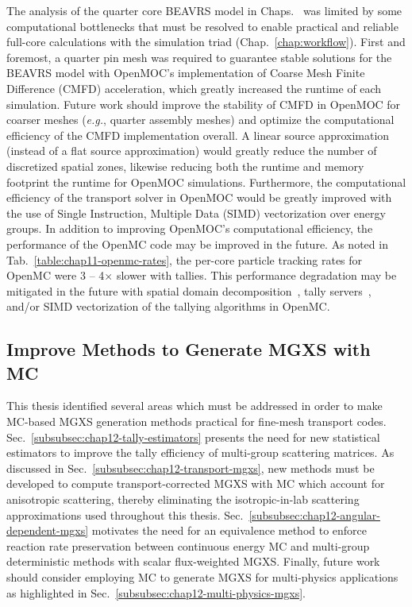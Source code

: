 The analysis of the quarter core \ac{BEAVRS} model in Chaps.~ was limited by some computational bottlenecks that must be resolved to enable practical and reliable full-core calculations with the simulation triad (Chap.~\ref{chap:workflow}). First and foremost, a quarter pin mesh was required to guarantee stable solutions for the \ac{BEAVRS} model with OpenMOC's implementation of Coarse Mesh Finite Difference (CMFD) acceleration, which greatly increased the runtime of each simulation. Future work should improve the stability of \ac{CMFD} in OpenMOC for coarser meshes (\textit{e.g.}, quarter assembly meshes) and optimize the computational efficiency of the \ac{CMFD} implementation overall. A linear source approximation (instead of a flat source approximation) would greatly reduce the number of discretized spatial zones, likewise reducing both the runtime and memory footprint the runtime for OpenMOC simulations. Furthermore, the computational efficiency of the transport solver in OpenMOC would be greatly improved with the use of Single Instruction, Multiple Data (SIMD) vectorization over energy groups. In addition to improving OpenMOC's computational efficiency, the performance of the OpenMC code may be improved in the future. As noted in Tab.~\ref{table:chap11-openmc-rates}, the per-core particle tracking rates for OpenMC were 3 -- 4$\times$ slower with tallies. This performance degradation may be mitigated in the future with spatial domain decomposition~\cite{horelik2014dd}, tally servers~\cite{romano2013servers}, and/or SIMD vectorization of the tallying algorithms in OpenMC.

\subsection{Improve Methods to Generate MGXS with MC}
\label{subsec:chap12-improve-mc-methods}

This thesis identified several areas which must be addressed in order to make \ac{MC}-based \ac{MGXS} generation methods practical for fine-mesh transport codes. Sec.~\ref{subsubsec:chap12-tally-estimators} presents the need for new statistical estimators to improve the tally efficiency of multi-group scattering matrices. As discussed in Sec.~\ref{subsubsec:chap12-transport-mgxs}, new methods must be developed to compute transport-corrected \ac{MGXS} with \ac{MC} which account for anisotropic scattering, thereby eliminating the isotropic-in-lab scattering approximations used throughout this thesis. Sec.~\ref{subsubsec:chap12-angular-dependent-mgxs} motivates the need for an equivalence method to enforce reaction rate preservation between continuous energy \ac{MC} and multi-group deterministic methods with scalar flux-weighted \ac{MGXS}. Finally, future work should consider employing \ac{MC} to generate \ac{MGXS} for multi-physics applications as highlighted in Sec.~\ref{subsubsec:chap12-multi-physics-mgxs}.

